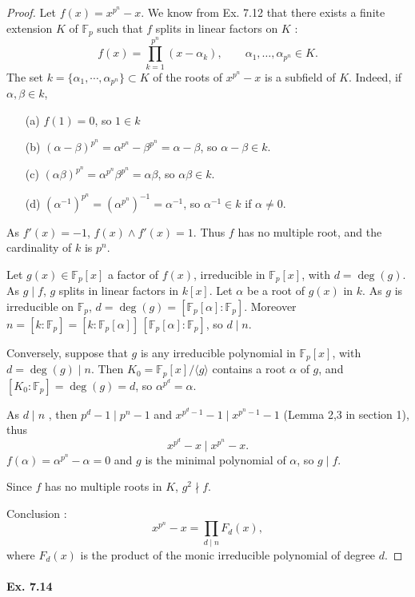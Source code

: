 \documentclass[11pt,a4paper]{article}
\newcommand{\F}{\mathbb{F}}
\begin{document}
\begin{proof}
Let $f(x) =  x^{p^n} -x$. We know from Ex. 7.12 that there exists a finite extension $K$ of $\F_p$ such that $f$ splits in linear factors on $K$ :
$$f(x) = \prod_{k=1}^{p^n} (x-\alpha_k), \qquad \alpha_1,\ldots, \alpha_{p^n} \in K.$$
The set $k =\{\alpha_1,\cdots,\alpha_{p^n}\} \subset K$ of the roots of $x^{p^n} -x$ is a subfield of $K$. Indeed, if $\alpha, \beta \in k$,
\begin{enumerate}
\item[(a)] $f(1) = 0$, so $1 \in k$
\item[(b)]$(\alpha- \beta)^{p^n} = \alpha^{p^n} - \beta^{p^n} = \alpha - \beta$, so $\alpha - \beta \in k$.
\item[(c)] $(\alpha\beta)^{p^n} = \alpha^{p^n} \beta^{p^n} = \alpha  \beta$, so $\alpha \beta \in k$.
\item[(d)] $(\alpha^{-1})^{p^n} = (\alpha^{p^n})^{-1} = \alpha^{-1}$, so $\alpha^{-1} \in k$ if $\alpha \ne 0$.
\end{enumerate}
As $f'(x) = -1$, $f(x) \wedge f'(x) = 1$. Thus $f$ has no multiple root, and the cardinality of $k$ is $p^n$.

Let $g(x) \in \F_p[x]$ a factor of $f(x)$, irreducible in $\F_p[x]$, with $d =\deg(g)$. As $g \mid f$, $g$ splits in linear factors in $k[x]$. Let $\alpha$ be a root of $g(x)$ in $k$. As $g$ is irreducible on $\F_p$, 
$d = \deg(g) = [\F_p[\alpha] : \F_p]$. Moreover $ n = [k : \F_p] = [k : \F_p[\alpha]]\,[\F_p[\alpha] : \F_p]$, so $d \mid n$.

Conversely, suppose that $g$ is any irreducible polynomial in $\F_p[x]$, with $d = \deg(g) \mid n$. Then $K_0 = \F_p[x]/ \langle g\rangle$  contains a root $\alpha$ of $g$, and $[K_0:\F_p] = \deg(g) = d$, so $\alpha^{p^d} = \alpha$.

As $d\mid n$ , then $p^d-1 \mid p^n-1$ and $x^{p^d -1}-1 \mid x^{p^n-1}-1$ (Lemma 2,3 in section 1), thus 
$$x^{p^d} - x \mid x^{p^n}-x.$$
$f(\alpha) = \alpha^{p^n} - \alpha = 0$ and $g$ is the minimal polynomial of $\alpha$, so $g \mid f$.

Since $f$ has no multiple roots in $K$, $g^2 \nmid f$.

Conclusion : 
$$ x^{p^n}-x = \prod_{d\mid n} F_d(x),$$
where $F_d(x)$ is the product of the monic irreducible polynomial of degree $d$.
\end{proof}

\paragraph{Ex. 7.14}
\end{document}
